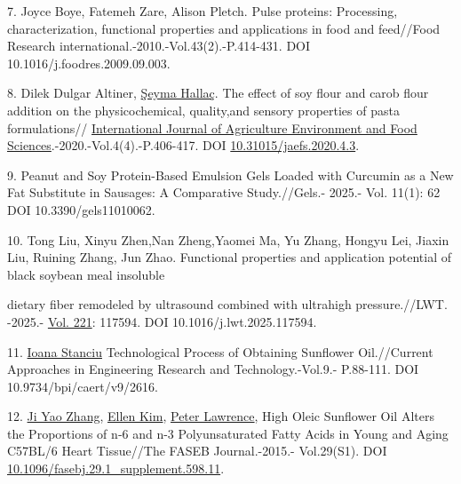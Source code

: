 \begin{refs}
7. Joyce Boye, Fatemeh Zare, Alison Pletch. Pulse proteins: Processing,
characterization, functional properties and applications in food and
feed//Food Research international.-2010.-Vol.43(2).-P.414-431. DOI
10.1016/j.foodres.2009.09.003.

8. Dilek Dulgar Altiner,
\href{https://www.researchgate.net/profile/Seyma_Hallac?_tp=eyJjb250ZXh0Ijp7ImZpcnN0UGFnZSI6InB1YmxpY2F0aW9uIiwicGFnZSI6InB1YmxpY2F0aW9uIn19}{Şeyma
Hallaç}. The effect of soy flour and carob flour addition on the
physicochemical, quality,and sensory properties of pasta formulations//
\href{https://www.researchgate.net/journal/International-Journal-of-Agriculture-Environment-and-Food-Sciences-2602-246X?_tp=eyJjb250ZXh0Ijp7ImZpcnN0UGFnZSI6InB1YmxpY2F0aW9uIiwicGFnZSI6InB1YmxpY2F0aW9uIn19}{International
Journal of Agriculture Environment and Food
Sciences}.-2020.-Vol.4(4).-P.406-417. DOI
\href{https://doi.org/10.31015/jaefs.2020.4.3}{10.31015/jaefs.2020.4.3}.

9. Peanut and Soy Protein-Based Emulsion Gels Loaded with Curcumin as a
New Fat Substitute in Sausages: A Comparative Study.//Gels.- 2025.- Vol.
11(1): 62 DOI 10.3390/gels11010062.

10. Tong Liu, Xinyu Zhen,Nan Zheng,Yaomei Ma, Yu Zhang, Hongyu Lei,
Jiaxin Liu, Ruining Zhang, Jun Zhao. Functional properties and
application potential of black soybean meal insoluble

dietary fiber remodeled by ultrasound combined with ultrahigh
pressure.//LWT. -2025.-
\href{https://www.sciencedirect.com/journal/lwt/vol/221/suppl/C}{Vol.
221}: 117594. DOI 10.1016/j.lwt.2025.117594.

11. \href{https://www.researchgate.net/profile/Ioana-Stanciu-3?_tp=eyJjb250ZXh0Ijp7ImZpcnN0UGFnZSI6InB1YmxpY2F0aW9uIiwicGFnZSI6InB1YmxpY2F0aW9uIn19}{Ioana
Stanciu} Technological Process of Obtaining Sunflower Oil.//Current
Approaches in Engineering Research and Technology.-Vol.9.- P.88-111. DOI
10.9734/bpi/caert/v9/2616.

12. \href{https://www.researchgate.net/profile/Ji-Yao-Zhang?_tp=eyJjb250ZXh0Ijp7ImZpcnN0UGFnZSI6InB1YmxpY2F0aW9uIiwicGFnZSI6InB1YmxpY2F0aW9uIn19}{Ji
Yao Zhang},
\href{https://www.researchgate.net/profile/Ellen-Kim-7?_tp=eyJjb250ZXh0Ijp7ImZpcnN0UGFnZSI6InB1YmxpY2F0aW9uIiwicGFnZSI6InB1YmxpY2F0aW9uIn19}{Ellen
Kim},
\href{https://www.researchgate.net/profile/Peter-Lawrence-15?_tp=eyJjb250ZXh0Ijp7ImZpcnN0UGFnZSI6InB1YmxpY2F0aW9uIiwicGFnZSI6InB1YmxpY2F0aW9uIn19}{Peter
Lawrence}, High Oleic Sunflower Oil Alters the Proportions of n‐6 and
n-3 Polyunsaturated Fatty Acids in Young and Aging C57BL/6 Heart
Tissue//The FASEB Journal.-2015.- Vol.29(S1). DOI
\href{https://doi.org/10.1096/fasebj.29.1_supplement.598.11?urlappend=?utm_source=researchgate.net&utm_medium=article}{10.1096/fasebj.29.1\_supplement.598.11}.


\end{refs}
